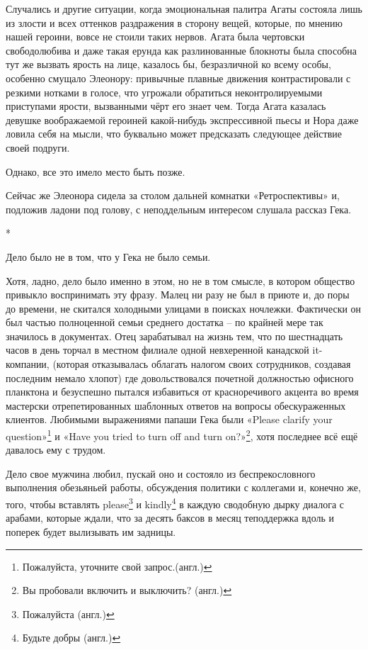 \documentclass[
  a5paperpaper,
  DIV=11,
  numbers=noendperiod]{scrreprt}
\begin{document}
Случались и другие ситуации, когда эмоциональная палитра Агаты состояла
лишь из злости и всех оттенков раздражения в сторону вещей, которые, по
мнению нашей героини, вовсе не стоили таких нервов. Агата была чертовски
свободолюбива и даже такая ерунда как разлинованные блокноты была
способна тут же вызвать ярость на лице, казалось бы, безразличной ко
всему особы, особенно смущало Элеонору: привычные плавные движения
контрастировали с резкими нотками в голосе, что угрожали обратиться
неконтролируемыми приступами ярости, вызванными чёрт его знает чем.
Тогда Агата казалась девушке воображаемой героиней какой-нибудь
экспрессивной пьесы и Нора даже ловила себя на мысли, что буквально
может предсказать следующее действие своей подруги.

Однако, все это имело место быть позже.

Сейчас же Элеонора сидела за столом дальней комнатки «Ретроспективы» и,
подложив ладони под голову, с неподдельным интересом слушала рассказ
Гека.

*

Дело было не в том, что у Гека не было семьи.

Хотя, ладно, дело было именно в этом, но не в том смысле, в котором
общество привыкло воспринимать эту фразу. Малец ни разу не был в приюте
и, до поры до времени, не скитался холодными улицами в поисках ночлежки.
Фактически он был частью полноценной семьи среднего достатка -- по
крайней мере так значилось в документах. Отец зарабатывал на жизнь тем,
что по шестнадцать часов в день торчал в местном филиале одной
невхеренной канадской it-компании, (которая отказывалась облагать
налогом своих сотрудников, создавая последним немало хлопот) где
довольствовался почетной должностью офисного планктона и безуспешно
пытался избавиться от красноречивого акцента во время мастерски
отрепетированных шаблонных ответов на вопросы обескураженных клиентов.
Любимыми выражениями папаши Гека были «Please clarify your
question»\footnote{Пожалуйста, уточните свой запрос.(англ.)} и «Have you
tried to turn off and turn on?»\footnote{Вы пробовали включить и
  выключить? (англ.)}, хотя последнее всё ещё давалось ему с трудом.

Дело свое мужчина любил, пускай оно и состояло из беспрекословного
выполнения обезьяньей работы, обсуждения политики с коллегами и, конечно
же, того, чтобы вставлять please\footnote{Пожалуйста (англ.)} и
kindly\footnote{Будьте добры (англ.)} в каждую сводобную дырку диалога с
арабами, которые ждали, что за десять баксов в месяц теподдержка вдоль и
поперек будет вылизывать им задницы.
\end{document}
